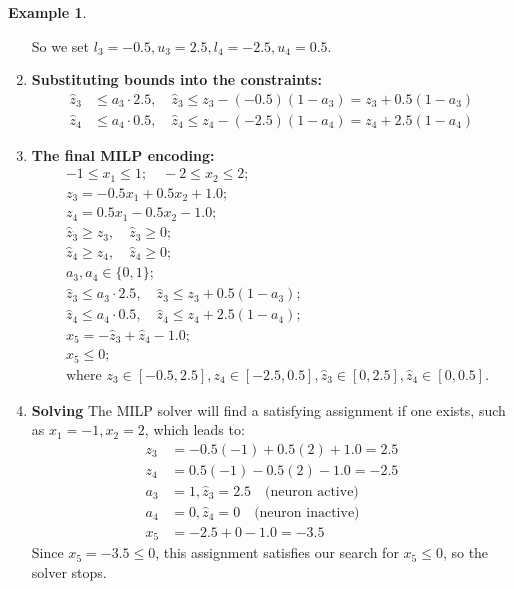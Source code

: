 \documentclass[oneside,11pt,dvipsnames]{book}
\numberwithin{equation}{section}
\theoremstyle{definition}
\newtheorem{example}{Example}[section]
\theoremstyle{remark}
\begin{document}
\begin{example}
\begin{enumerate}
So we set $l_3 = -0.5, u_3 = 2.5, l_4 = -2.5, u_4 = 0.5$. 

\item \textbf{Substituting bounds into the constraints:}
\begin{align*}
\hat{z}_3 &\le a_3 \cdot 2.5, \quad \hat{z}_3 \le z_3 - (-0.5)(1 - a_3) = z_3 + 0.5(1 - a_3) \\
\hat{z}_4 &\le a_4 \cdot 0.5, \quad \hat{z}_4 \le z_4 - (-2.5)(1 - a_4) = z_4 + 2.5(1 - a_4)
\end{align*}

\item \textbf{The final MILP encoding:}
\begin{align*}
& -1 \le x_1 \le 1; \quad -2 \le x_2 \le 2; \\
& z_3 = -0.5x_1 + 0.5x_2 + 1.0; \\
& z_4 = 0.5x_1 - 0.5x_2 - 1.0; \\
& \hat{z}_3 \ge z_3, \quad \hat{z}_3 \ge 0; \\
& \hat{z}_4 \ge z_4, \quad \hat{z}_4 \ge 0; \\
& a_3, a_4 \in \{0, 1\}; \\
& \hat{z}_3 \le a_3 \cdot 2.5, \quad \hat{z}_3 \le z_3 + 0.5(1 - a_3); \\
& \hat{z}_4 \le a_4 \cdot 0.5, \quad \hat{z}_4 \le z_4 + 2.5(1 - a_4); \\
& x_5 = -\hat{z}_3 + \hat{z}_4 - 1.0; \\
& x_5 \le 0; \\
& \text{where } z_3 \in [-0.5, 2.5], z_4 \in [-2.5, 0.5], \hat{z}_3 \in [0, 2.5], \hat{z}_4 \in [0, 0.5].
\end{align*}

\item \textbf{Solving} The MILP solver will find a satisfying assignment if one exists, such as $x_1 = -1, x_2 = 2$, which leads to:
\begin{align*}
z_3 &= -0.5(-1) + 0.5(2) + 1.0 = 2.5 \\
z_4 &= 0.5(-1) - 0.5(2) - 1.0 = -2.5 \\
a_3 &= 1, \hat{z}_3 = 2.5 \quad \text{(neuron active)} \\
a_4 &= 0, \hat{z}_4 = 0 \quad \text{(neuron inactive)} \\
x_5 &= -2.5 + 0 - 1.0 = -3.5
\end{align*}
Since $x_5 = -3.5 \le 0$, this assignment satisfies our search for $x_5 \le 0$, so the solver stops.

\end{enumerate}
\end{example}
\end{document}
